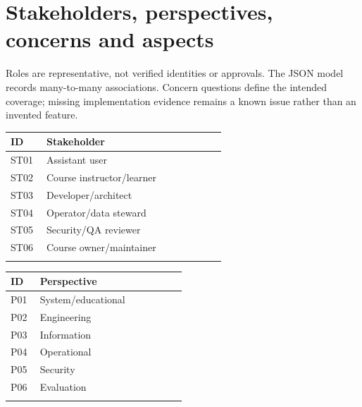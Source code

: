 \documentclass[10pt,letterpaper]{article}
\begin{document}
\section{Stakeholders, perspectives, concerns and aspects}
Roles are representative, not verified identities or approvals. The JSON model records many-to-many associations. Concern questions define the intended coverage; missing implementation evidence remains a known issue rather than an invented feature.
\begin{longtable}{@{}>{\raggedright\arraybackslash}p{0.15\linewidth}>{\raggedright\arraybackslash}p{0.75\linewidth}@{}}
\toprule
ID & Stakeholder\\\midrule\endhead
ST01 & Assistant user\\\addlinespace
ST02 & Course instructor/learner\\\addlinespace
ST03 & Developer/architect\\\addlinespace
ST04 & Operator/data steward\\\addlinespace
ST05 & Security/QA reviewer\\\addlinespace
ST06 & Course owner/maintainer\\\addlinespace
\bottomrule\end{longtable}
\begin{longtable}{@{}>{\raggedright\arraybackslash}p{0.15\linewidth}>{\raggedright\arraybackslash}p{0.75\linewidth}@{}}
\toprule
ID & Perspective\\\midrule\endhead
P01 & System/educational\\\addlinespace
P02 & Engineering\\\addlinespace
P03 & Information\\\addlinespace
P04 & Operational\\\addlinespace
P05 & Security\\\addlinespace
P06 & Evaluation\\\addlinespace
\bottomrule\end{longtable}
\end{document}
